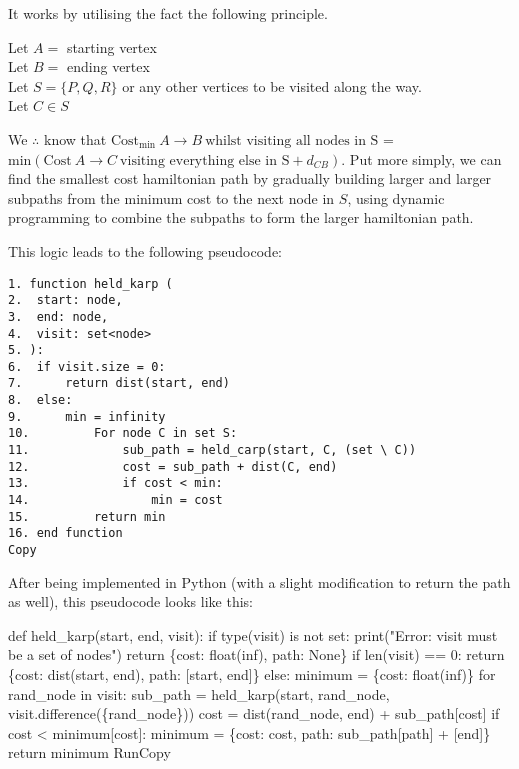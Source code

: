 \documentclass[
]{article}
\newenvironment{Shaded}{}{}
\newcommand{\NormalTok}[1]{#1}
\begin{document}
It works by utilising the fact the following principle.

Let {\(A =\)} starting vertex\\
Let {\(B =\)} ending vertex\\
Let {\(S = \{ P,Q,R\}\)} or any other vertices to be visited along the
way.\\
Let {\(C \in S\)}

We {\(\therefore\)} know that
{\(\text{Cost}_{\text{min}}\ A\rightarrow B\ \text{whilst\ visiting\ all\ nodes\ in\ S}\)}
=
{\(\text{min}(\text{Cost}\ A\rightarrow C\ \text{visiting\ everything\ else\ in\ S} + d_{CB})\)}.
Put more simply, we can find the smallest cost hamiltonian path by
gradually building larger and larger subpaths from the minimum cost to
the next node in {\(S\)}, using dynamic programming to combine the
subpaths to form the larger hamiltonian path.

This logic leads to the following pseudocode:

\begin{verbatim}
1. function held_karp (
2.  start: node, 
3.  end: node, 
4.  visit: set<node>
5. ):
6.  if visit.size = 0:
7.      return dist(start, end)
8.  else:
9.      min = infinity
10.         For node C in set S:
11.             sub_path = held_carp(start, C, (set \ C))
12.             cost = sub_path + dist(C, end)
13.             if cost < min:
14.                 min = cost
15.         return min
16. end function
Copy
\end{verbatim}

After being implemented in Python (with a slight modification to return
the path as well), this pseudocode looks like this:

\begin{Shaded}
\begin{Highlighting}[]
\NormalTok{def held\_karp(start, end, visit):}
\NormalTok{    if type(visit) is not set:}
\NormalTok{        print("Error: visit must be a set of nodes")}
\NormalTok{        return \{\textquotesingle{}cost\textquotesingle{}: float(\textquotesingle{}inf\textquotesingle{}), \textquotesingle{}path\textquotesingle{}: None\}}
\NormalTok{    if len(visit) == 0:}
\NormalTok{        return \{\textquotesingle{}cost\textquotesingle{}: dist(start, end), \textquotesingle{}path\textquotesingle{}: [start, end]\}}
\NormalTok{    else:}
\NormalTok{        minimum = \{\textquotesingle{}cost\textquotesingle{}: float(\textquotesingle{}inf\textquotesingle{})\}}
\NormalTok{        for rand\_node in visit:}
\NormalTok{            sub\_path = held\_karp(start, rand\_node, visit.difference(\{rand\_node\}))}
\NormalTok{            cost = dist(rand\_node, end) + sub\_path[\textquotesingle{}cost\textquotesingle{}]}
\NormalTok{            if cost \textless{} minimum[\textquotesingle{}cost\textquotesingle{}]:}
\NormalTok{                minimum = \{\textquotesingle{}cost\textquotesingle{}: cost, \textquotesingle{}path\textquotesingle{}: sub\_path[\textquotesingle{}path\textquotesingle{}] + [end]\}}
\NormalTok{        return minimum}
\NormalTok{RunCopy}
\end{Highlighting}
\end{Shaded}
\end{document}
